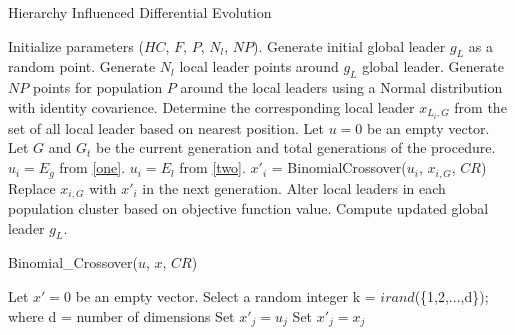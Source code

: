 \documentclass[a4paper,twoside]{article}
\begin{document}

\begin{algorithm}[b]
\caption{Hierarchy Influenced Differential Evolution}
\label{algo}
\begin{algorithmic}[1]
    \State Initialize parameters ($HC$, $F$, $P$, $N_l$, $NP$).
    \State Generate initial global leader $g_L$ as a random point.
    \State Generate $N_l$ local leader points around $g_L$ global leader.
    \State Generate $NP$ points for population $P$ around the local leaders using a Normal distribution with identity covarience.
        \State Determine the corresponding local leader $x_{L_i,G}$ from the set of all local leader based on nearest position.
        \State Let $u = 0$ be an empty vector.
        \State Let $G$ and $G_{t}$ be the current generation and total generations of the procedure.
          \State $u_i = E_g$ from \eqref{one}.
        \Else
          \State $u_i = E_l$ from \eqref{two}.
        \EndIf
        \State $x'_{i}$ = BinomialCrossover($u_{i}$, $x_{i,G}$, $CR$)
          \State Replace $x_{i,G}$ with $x'_{i}$ in the next generation.
        \EndIf
      \EndFor
      \State Alter local leaders in each population cluster based on objective function value.
      \State Compute updated global leader $g_L$.
    \EndWhile
  \EndProcedure
\end{algorithmic}
\end{algorithm}

\begin{algorithm}[b]
\caption{Binomial\_Crossover($u$, $x$, $CR$)}
\label{algo}
\begin{algorithmic}[1]
    \State Let $x' = 0$ be an empty vector.
    \State Select a random integer k = $irand$(\{1,2,...,d\}); where d = number of dimensions
        \State Set $x'_{j} = u_{j}$
      \Else
        \State Set $x'_{j} = x_{j}$
      \EndIf
    \EndFor
  \EndProcedure
\end{algorithmic}
\end{algorithm}
\end{document}
